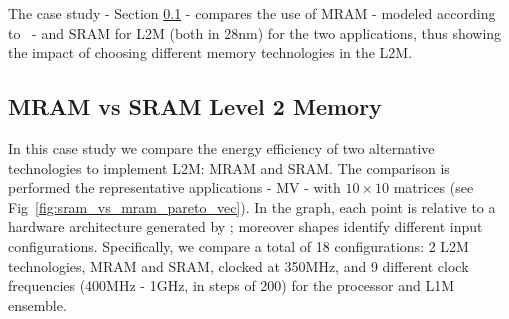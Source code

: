 The case study - Section \ref{ssec:case_study2} - compares the use of MRAM - modeled according to~\cite{8310393} - and SRAM for L2M (both in 28nm) for the two applications, thus showing the impact of choosing different memory technologies in the L2M.

\label{ssec:exp_single}


\vspace{-1mm}
\subsection{MRAM vs SRAM Level 2 Memory}
\label{ssec:case_study2}
\vspace{-1mm}

In this case study we compare the energy efficiency of two alternative technologies to implement L2M: MRAM and SRAM.
The comparison is performed the representative applications - MV - with $10\times10$ matrices (see Fig~\ref{fig:sram_vs_mram_pareto_vec}). In the graph, each point is relative to a hardware architecture generated by \frameworkname; moreover shapes identify different input configurations. Specifically, we compare a total of 18 configurations: 2 L2M technologies, MRAM and SRAM, clocked at 350MHz, and 9 different clock frequencies (400MHz - 1GHz, in steps of 200) for the processor and L1M ensemble.

